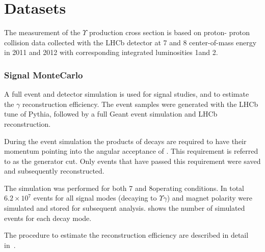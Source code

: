 \section{Datasets}
\label{sec:datasets}

The measurement of the $\Upsilon$ production cross section is based on proton-
proton collision data collected with the LHCb detector at 7 and 8\tev
center-of-mass energy in 2011 and 2012 with corresponding integrated luminosities
1\invfb and 2\invfb.

\subsubsection{Signal MonteCarlo}

A full event and detector simulation is used for signal studies, and to
estimate the $\gamma$ reconstruction efficiency. The event samples were
generated with the LHCb tune of Pythia\cite{LHCb-PROC-2010-056}, followed by a
full Geant\cite{Allison:2006ve} event simulation and LHCb reconstruction.

During the event simulation the products of \chib decays are required
to have their momentum pointing into the angular acceptance of \lhcb. This
requirement is referred to as the generator cut. Only events that have passed this
requirement were saved and subsequently reconstructed.

The simulation was performed for both 7 and 8\tev operating conditions. In
total $6.2\times10^7$ events for all signal modes (\chib decaying to $\Upsilon
\gamma$) and magnet polarity were simulated and stored for subsequent
analysis.  shows the number of simulated events for each decay
mode.




The procedure to estimate the
reconstruction efficiency are described in detail in~.

